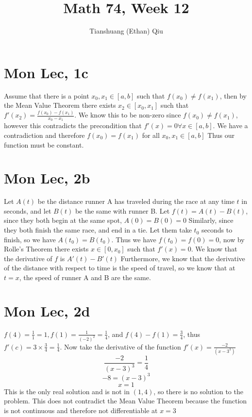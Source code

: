 \documentclass[12pt]{article}
\author{Tianshuang (Ethan) Qiu}
\begin{document}
\title{Math 74, Week 12}
\maketitle
\newpage

\section{Mon Lec, 1c}
Assume that there is a point $x_0, x_1 \in [a,b]$ such that $f(x_0) \not = f(x_1)$, then by the Mean Value Theorem there exists $x_2 \in [x_0, x_1]$ such that $f'(x_2)=\frac{f(x_0)-f(x_1)}{x_0-x_1}$. We know this to be non-zero since $f(x_0) \not = f(x_1)$, however this contradicts the precondition that $f'(x)=0 \forall x \in [a,b]$. We have a contradiction and therefore $f(x_0)=f(x_1)$ for all $x_0, x_1 \in [a,b]$
Thus our function must be constant.

\section{Mon Lec, 2b}
Let $A(t)$ be the distance runner A has traveled during the race at any time $t$ in seconds, and let $B(t)$ be the same with runner B. Let $f(t)=A(t)-B(t)$, since they both begin at the same spot, $A(0)=B(0)=0$
\newline
Similarly, since they both finish the same race, and end in a tie. Let them take $t_0$ seconds to finish, so we have $A(t_0)=B(t_0)$. Thus we have $f(t_0)=f(0)=0$, now by Rolle's Theorem there exists $x \in [0,x_0]$ such that $f'(x)=0$. We know that the derivative of $f$ is $A'(t)-B'(t)$
Furthermore, we know that the derivative of the distance with respect to time is the speed of travel, so we know that at $t=x$, the speed of runner A and B are the same.

\section{Mon Lec, 2d}
$f(4)=\frac{1}{1}=1, f(1)=\frac{1}{(-2)^2}=\frac{1}{4}$, and $f(4)-f(1)=\frac{3}{4}$, thus $f'(c)=3 \times \frac{3}{4} = \frac{1}{4}$. Now take the derivative of the function $f'(x)=\frac{-2}{(x-3^3)}$
$$\frac{-2}{(x-3)^3} = \frac{1}{4}$$
$$-8 = (x-3)^3$$
$$x=1$$
This is the only real solution and is not in $(1,4)$, so there is no solution to the problem. This does not contradict the Mean Value Theorem because the function is not continuous and therefore not differentiable at $x=3$
\newpage
\end{document}
